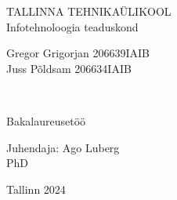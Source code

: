 \begin{titlepage}

\headheight=57pt
\footskip=5pt
\headsep=0pt

\centering
TALLINNA TEHNIKAÜLIKOOL\\
Infotehnoloogia teaduskond

\vspace*{4.5 cm}

\begin{center}

Gregor Grigorjan 206639IAIB\\
Juss Põldsam 206634IAIB\\
\vspace*{1.5 cm}

\begin{Large}
\textsc{\textbf{\thesisTitle}}\\
\end{Large}

\vspace*{1.5 cm}
Bakalaureusetöö
\end{center}

\vspace*{0.6 cm}

\begin{flushright}
Juhendaja: Ago Luberg\\PhD\\
\vspace*{0.2 cm}
\end{flushright}
\vfill

Tallinn 2024
\end{titlepage}

